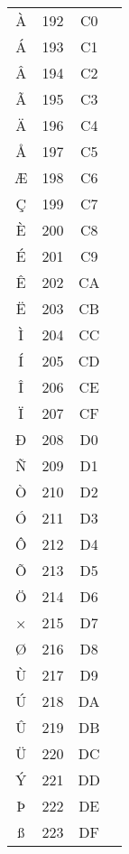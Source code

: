 \documentclass[10pt]{article}
\begin{document}
\begin{tabular}{crcl}
À&192&C0&\\
Á&193&C1&\\
Â&194&C2&\\
Ã&195&C3&\\
Ä&196&C4&\\
Å&197&C5&\\
Æ&198&C6&\\
Ç&199&C7&\\
È&200&C8&\\
É&201&C9&\\
Ê&202&CA&\\
Ë&203&CB&\\
Ì&204&CC&\\
Í&205&CD&\\
Î&206&CE&\\
Ï&207&CF&\\
Ð&208&D0&\\
Ñ&209&D1&\\
Ò&210&D2&\\
Ó&211&D3&\\
Ô&212&D4&\\
Õ&213&D5&\\
Ö&214&D6&\\
×&215&D7&\\
Ø&216&D8&\\
Ù&217&D9&\\
Ú&218&DA&\\
Û&219&DB&\\
Ü&220&DC&\\
Ý&221&DD&\\
Þ&222&DE&\\
ß&223&DF&\\
\end{tabular}
\end{document}

